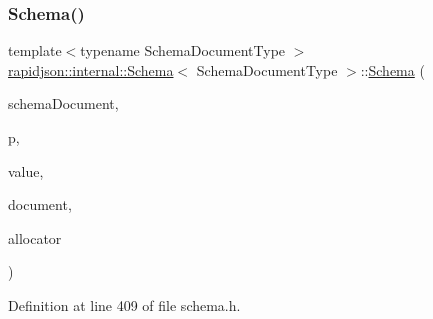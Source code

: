 \subsubsection{\texorpdfstring{Schema()}{Schema()}}
{\footnotesize\ttfamily template$<$typename Schema\+Document\+Type $>$ \\
\mbox{\hyperlink{classrapidjson_1_1internal_1_1_schema}{rapidjson\+::internal\+::\+Schema}}$<$ Schema\+Document\+Type $>$\+::\mbox{\hyperlink{classrapidjson_1_1internal_1_1_schema}{Schema}} (\begin{DoxyParamCaption}\item[{Schema\+Document\+Type $\ast$}]{schema\+Document,  }\item[{const \mbox{\hyperlink{classrapidjson_1_1internal_1_1_schema_aa54c71c41aa8a9091565d12ffe27627c}{Pointer\+Type}} \&}]{p,  }\item[{const \mbox{\hyperlink{classrapidjson_1_1internal_1_1_schema_a3979a9083c598195927c08c6e3ba91d1}{Value\+Type}} \&}]{value,  }\item[{const \mbox{\hyperlink{classrapidjson_1_1internal_1_1_schema_a3979a9083c598195927c08c6e3ba91d1}{Value\+Type}} \&}]{document,  }\item[{\mbox{\hyperlink{classrapidjson_1_1internal_1_1_schema_aaca940c164d906fdbf504f562bb2f956}{Allocator\+Type}} $\ast$}]{allocator }\end{DoxyParamCaption})}



Definition at line 409 of file schema.\+h.


